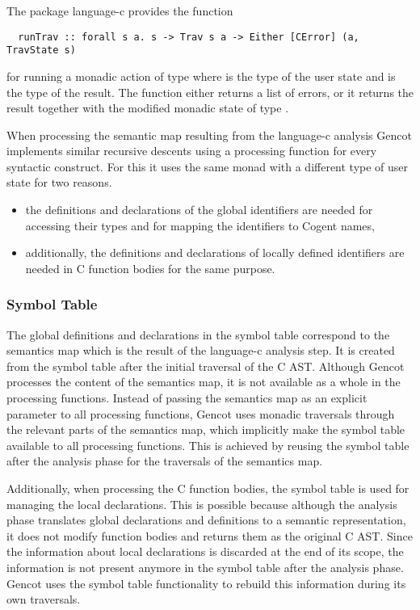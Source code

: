 The package language-c provides the function
\begin{verbatim}
  runTrav :: forall s a. s -> Trav s a -> Either [CError] (a, TravState s)
\end{verbatim}
for running a monadic action of type  where  is the type of the user state and  is
the type of the result. The function either returns a list of errors, or it returns the result together with the
modified monadic state of type .

When processing the semantic map resulting from the language-c analysis Gencot implements similar recursive 
descents using a processing function for every syntactic construct. For this it uses the same monad with a
different type of user state for two reasons.
\begin{itemize}
\item the definitions and declarations of the global identifiers are needed for accessing their types and for
mapping the identifiers to Cogent names,
\item additionally, the definitions and declarations of locally defined identifiers are needed in C function
bodies for the same purpose.
\end{itemize}

\subsubsection{Symbol Table}

The global definitions and declarations in the symbol table correspond to the semantics map which is the result
of the language-c analysis step. It is created from the symbol table after the initial traversal of the C AST. Although Gencot 
processes the content of the semantics map, it is not available as a whole in the processing functions. Instead
of passing the semantics map as an explicit parameter to all processing functions, Gencot uses monadic traversals
through the relevant parts of the semantics map, which implicitly make the symbol table available to all 
processing functions. This is achieved by reusing the symbol table after the analysis phase for the traversals
of the semantics map.

Additionally, when processing the C function bodies, the symbol table is used for managing the local declarations. 
This is possible because although the analysis phase translates global declarations and definitions to a 
semantic representation, it does not modify function bodies and returns them as the original C AST. Since
the information about local declarations is discarded at the end of its scope, the information is not 
present anymore in the symbol table after the analysis phase. Gencot uses the symbol table functionality
to rebuild this information during its own traversals.

